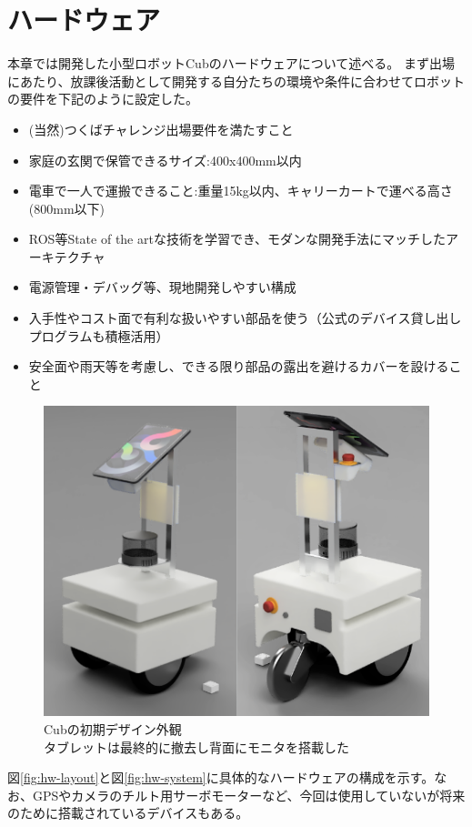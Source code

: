 \documentclass[platex,dvipdfmx]{rbproceedings}
\begin{document}
\section{ハードウェア}
本章では開発した小型ロボットCubのハードウェアについて述べる。
まず出場にあたり、放課後活動として開発する自分たちの環境や条件に合わせてロボットの要件を下記のように設定した。

\begin{itemize}
\item (当然)つくばチャレンジ出場要件を満たすこと
\item 家庭の玄関で保管できるサイズ:400x400mm以内
\item 電車で一人で運搬できること:重量15kg以内、キャリーカートで運べる高さ(800mm以下)
\item ROS等State of the artな技術を学習でき、モダンな開発手法にマッチしたアーキテクチャ
\item 電源管理・デバッグ等、現地開発しやすい構成
\item 入手性やコスト面で有利な扱いやすい部品を使う（公式のデバイス貸し出しプログラムも積極活用）
\item 安全面や雨天等を考慮し、できる限り部品の露出を避けるカバーを設けること
\end{itemize}

\begin{figure}
    \centering
    \includegraphics[width=0.8\linewidth]{picture/cub_first-design.png}
    \caption{Cubの初期デザイン外観\\タブレットは最終的に撤去し背面にモニタを搭載した}
    \label{fig:first-design}
\end{figure}

図\ref{fig:hw-layout}と図\ref{fig:hw-system}に具体的なハードウェアの構成を示す。なお、GPSやカメラのチルト用サーボモーターなど、今回は使用していないが将来のために搭載されているデバイスもある。
\end{document}
